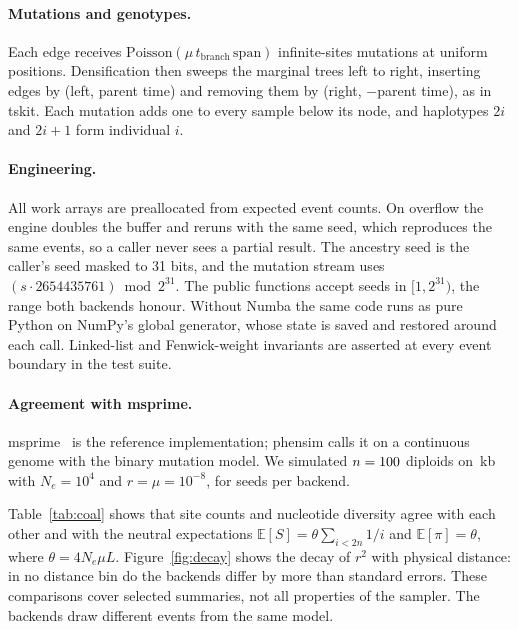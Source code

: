 \documentclass[11pt,a4paper]{article}
\newcommand{\E}{\mathbb{E}}
\begin{document}
\paragraph{Mutations and genotypes.}
Each edge receives $\mathrm{Poisson}(\mu\,t_{\mathrm{branch}}\,\mathrm{span})$
infinite-sites mutations at uniform positions. Densification then sweeps
the marginal trees left to right, inserting edges by (left, parent time)
and removing them by (right, $-$parent time), as in tskit. Each mutation
adds one to every sample below its node, and haplotypes $2i$ and $2i+1$
form individual $i$.

\paragraph{Engineering.}
All work arrays are preallocated from expected event counts. On overflow
the engine doubles the buffer and reruns with the same seed, which
reproduces the same events, so a caller never sees a partial result. The
ancestry seed is the caller's seed masked to 31 bits, and the mutation
stream uses $(s\cdot2654435761)\bmod2^{31}$. The public functions accept
seeds in $[1,2^{31})$, the range both backends honour. Without Numba the
same code runs as pure Python on NumPy's global generator, whose state is
saved and restored around each call. Linked-list and Fenwick-weight
invariants are asserted at every event boundary in the test suite.

\paragraph{Agreement with msprime.}
msprime~\cite{kelleher2016,baumdicker2022} is the reference implementation;
phensim calls it on a continuous genome with the binary mutation model. We
simulated $n=100$ diploids on \PhCoalKb\,kb with
$N_e=10^4$ and $r=\mu=10^{-8}$, for \PhCoalSeeds{} seeds per backend.

Table~\ref{tab:coal} shows that site counts and nucleotide diversity agree
with each other and with the neutral expectations
$\E[S]=\theta\sum_{i<2n}1/i$ and $\E[\pi]=\theta$, where $\theta=4N_e\mu L$.
Figure~\ref{fig:decay} shows the decay of $r^2$ with physical distance:
in no distance bin do the backends differ by more than \PhCoalMaxZ{}
standard errors. These comparisons cover selected summaries, not all properties of the
sampler. The backends draw different events from the same model.

\begin{table}[ht]\centering\small
\caption{Coalescent backends, mean over \PhCoalSeeds{} seeds (standard
error).}\label{tab:coal}

\end{table}
\end{document}
